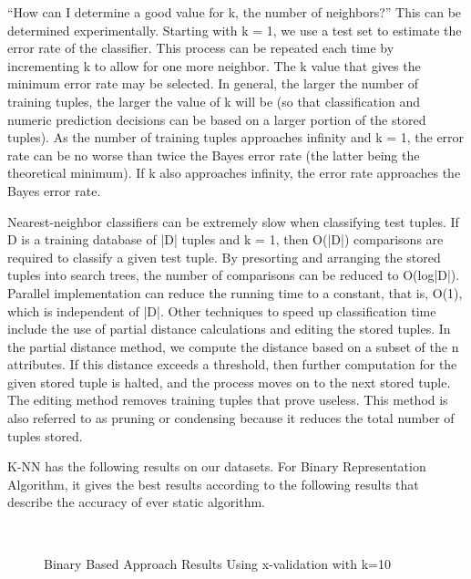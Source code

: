 \documentclass[12pt,fleqn]{book} %
\begin{document}
“How can I determine a good value for k, the number of neighbors?” This can be determined experimentally. Starting with k = 1, we use a test set to estimate the error rate
of the classifier. This process can be repeated each time by incrementing k to allow for one more neighbor. The k value that gives the minimum error rate may be selected. In
general, the larger the number of training tuples, the larger the value of k will be (so that classification and numeric prediction decisions can be based on a larger portion of the stored tuples). As the number of training tuples approaches infinity and k = 1, the error rate can be no worse than twice the Bayes error rate (the latter being the theoretical minimum). If k also approaches infinity, the error rate approaches the Bayes error rate.\bigskip

Nearest-neighbor classifiers can be extremely slow when classifying test tuples. If D is a training database of |D| tuples and k = 1, then O(|D|) comparisons are required to
classify a given test tuple. By presorting and arranging the stored tuples into search trees, the number of comparisons can be reduced to O(log|D|). Parallel implementation can
reduce the running time to a constant, that is, O(1), which is independent of |D|. Other techniques to speed up classification time include the use of partial distance
calculations and editing the stored tuples. In the partial distance method, we compute the distance based on a subset of the n attributes. If this distance exceeds a threshold,
then further computation for the given stored tuple is halted, and the process moves on to the next stored tuple. The editing method removes training tuples that prove useless. This method is also referred to as pruning or condensing because it reduces the total
number of tuples stored.\bigskip

K-NN has the following results on our datasets. For Binary Representation Algorithm, it gives the best results according to the following results that describe the accuracy of ever static algorithm.\bigskip

\begin{figure}[h]
\begin{dBox}
\centering
  \mbox{
   }
   \caption{Binary Based Approach Results Using x-validation with k=10\label{fig:r_knn_b} }   
\end{dBox}   
\end{figure}
\end{document}
